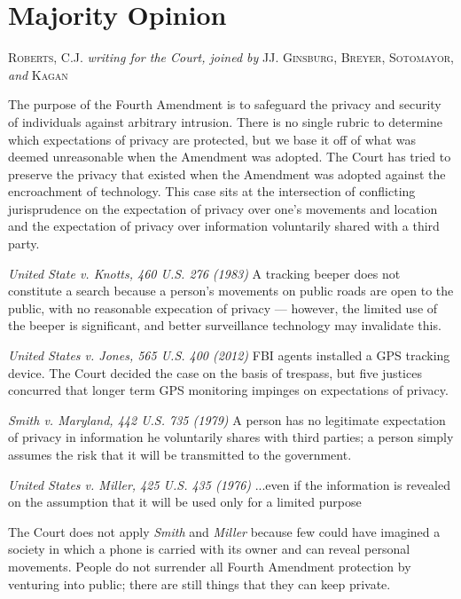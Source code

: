 \documentclass[paper=letter,fontsize=10pt]{article}
\begin{document}
\section{Majority Opinion}
	\noindent \textsc{Roberts, C.J.} \textit{writing for the Court, joined by} \textsc{JJ. Ginsburg}, \textsc{Breyer}, \textsc{Sotomayor}, \textit{and} \textsc{Kagan} \par
	The purpose of the Fourth Amendment is to safeguard the privacy and security of individuals against arbitrary intrusion. 
	There is no single rubric to determine which expectations of privacy are protected, but we base it off of what was deemed unreasonable when the Amendment was adopted.
	The Court has tried to preserve the privacy that existed when the Amendment was adopted against the encroachment of technology.
	This case sits at the intersection of conflicting jurisprudence on the expectation of privacy over one’s movements and location and the expectation of privacy over information voluntarily shared with a third party.
	\begin{description}
		\item{\textit{United State v. Knotts, 460 U.S. 276 (1983)}}
			A tracking beeper does not constitute a search because a person’s movements on public roads are open to the public, with no reasonable expecation of privacy --- however, the limited use of the beeper is significant, and better surveillance technology may invalidate this.
		\item{\textit{United States v. Jones, 565 U.S. 400 (2012)}}
			FBI agents installed a GPS tracking device. The Court decided the case on the basis of trespass, but five justices concurred that longer term GPS monitoring impinges on expectations of privacy.
		\item{\textit{Smith v. Maryland, 442 U.S. 735 (1979)}}
			A person has no legitimate expectation of privacy in information he voluntarily shares with third parties; a person simply assumes the risk that it will be transmitted to the government.
		\item{\textit{United States v. Miller, 425 U.S. 435 (1976)}}
			...even if the information is revealed on the assumption that it will be used only for a limited purpose
	\end{description}
	The Court does not apply \textit{Smith} and \textit{Miller} because 
	few could have imagined a society in which a phone is carried with its owner and can reveal personal movements.
	People do not surrender all Fourth Amendment protection by venturing into public; there are still things that they can keep private.
\end{document}
